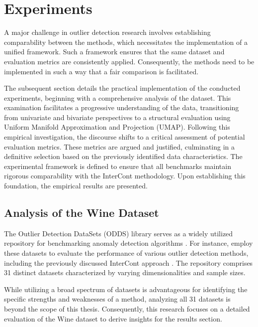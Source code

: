 \section{Experiments} \label{sec:Experiments}
A major challenge in outlier detection research involves establishing comparability between the methods, which necessitates the implementation of a unified framework.
Such a framework ensures that the same dataset and evaluation metrics are consistently applied.
Consequently, the methods need to be implemented in such a way that a fair comparison is facilitated.


The subsequent section details the practical implementation of the conducted experiments, beginning with a comprehensive analysis of the dataset. 
This examination facilitates a progressive understanding of the data, transitioning from univariate and bivariate perspectives to a structural evaluation using Uniform Manifold Approximation and Projection (UMAP). 
Following this empirical investigation, the discourse shifts to a critical assessment of potential evaluation metrics. 
These metrics are argued and justified, culminating in a definitive selection based on the previously identified data characteristics. 
The experimental framework is defined to ensure that all benchmarks maintain rigorous comparability with the InterCont methodology. 
Upon establishing this foundation, the empirical results are presented. 
\newpage


\subsection{Analysis of the Wine Dataset}\label{sec:data_analytics}
The Outlier Detection DataSets (ODDS) library serves as a widely utilized repository for benchmarking anomaly detection algorithms \citep{Rayana:2016}.
For instance, \citet{shenkar2022anomaly} employ these datasets to evaluate the performance of various outlier detection methods, including the previously discussed InterCont approach \citep[p. 5]{shenkar2022anomaly}. 
The repository comprises 31 distinct datasets characterized by varying dimensionalities and sample sizes. 



While utilizing a broad spectrum of datasets is advantageous for identifying the specific strengths and weaknesses of a method, analyzing all 31 datasets is beyond the scope of this thesis. 
Consequently, this research focuses on a detailed evaluation of the Wine dataset to derive insights for the results section.



